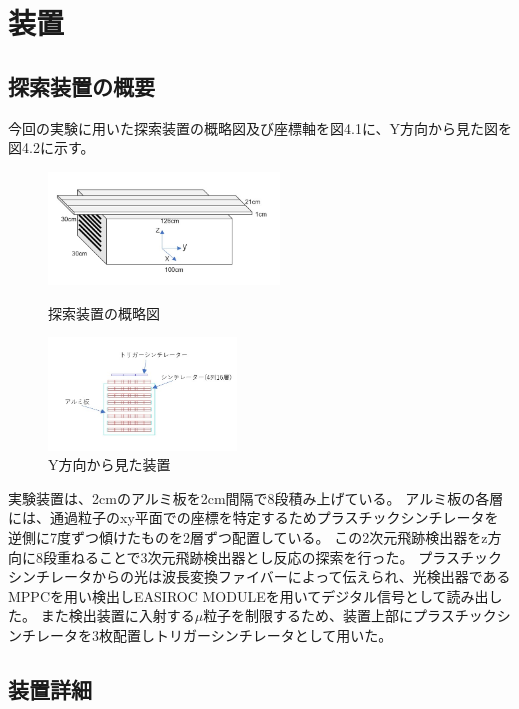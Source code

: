\chapter{装置} \label{equipment}
\section{探索装置の概要}
今回の実験に用いた探索装置の概略図及び座標軸を図4.1に、Y方向から見た図を図4.2に示す。

\begin{figure}[H]
    \begin{minipage}[b]{0.45\linewidth}
        \centering
        \includegraphics[height=3cm]{img/equipment.jpg}
        \caption{探索装置の概略図}
    \end{minipage}
    \begin{minipage}[b]{0.45\linewidth}
        \centering
        \includegraphics[height=3cm]{img/equipment_y.jpg}
        \caption{Y方向から見た装置}
    \end{minipage}
\end{figure}

実験装置は、2cmのアルミ板を2cm間隔で8段積み上げている。
アルミ板の各層には、通過粒子のxy平面での座標を特定するためプラスチックシンチレータを逆側に7度ずつ傾けたものを2層ずつ配置している。
この2次元飛跡検出器をz方向に8段重ねることで3次元飛跡検出器とし反応の探索を行った。
プラスチックシンチレータからの光は波長変換ファイバーによって伝えられ、光検出器であるMPPCを用い検出しEASIROC MODULEを用いてデジタル信号として読み出した。
また検出装置に入射する$\mu$粒子を制限するため、装置上部にプラスチックシンチレータを3枚配置しトリガーシンチレータとして用いた。

\section{装置詳細}
